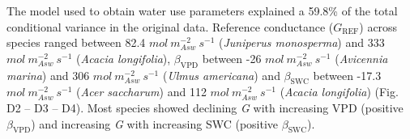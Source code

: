 \documentclass[11pt,twoside]{reedthesis}
\begin{document}
The model used to obtain water use parameters explained a 59.8\% of the
total conditional variance in the original data. Reference conductance
(\(G_{\text{REF}}\)) across species ranged between 82.4
\(mol\: m_{Asw}^{-2}\: s^{-1}\) (\emph{Juniperus monosperma}) and 333
\(mol\: m_{Asw}^{-2}\: s^{-1}\) (\emph{Acacia longifolia}),
\(\beta_{\text{VPD}}\) between -26 \(mol\: m_{Asw}^{-2}\: s^{-1}\)
(\emph{Avicennia marina}) and 306 \(mol\: m_{Asw}^{-2}\: s^{-1}\)
(\emph{Ulmus americana}) and \(\beta_{\text{SWC}}\) between -17.3
\(mol\: m_{Asw}^{-2}\: s^{-1}\) (\emph{Acer saccharum}) and 112
\(mol \: m_{Asw}^{-2}\: s^{-1}\) (\emph{Acacia longifolia}) (Fig. D2 --
D3 -- D4). Most species showed declining \emph{G} with increasing VPD
(positive \(\beta_{\text{VPD}}\)) and increasing \emph{G} with
increasing SWC (positive \(\beta_{\text{SWC}}\)).\par
\end{document}
